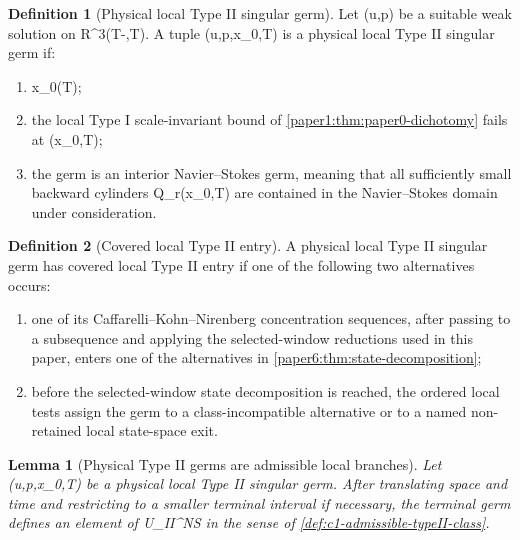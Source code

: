 \documentclass[11pt]{amsart}
\def\({}%
\def\){}%
\def\mathrm#1{#1}%
\def\mathbb#1{#1}%
\theoremstyle{plain}
\newtheorem{lemma}[lemma]{Lemma}
\theoremstyle{definition}
\newtheorem{definition}[definition]{Definition}
\theoremstyle{remark}
\begin{document}
\begin{definition}[Physical local Type II singular germ]
\label{paper6:def:physical-local-typeII-germ}
Let \((u,p)\) be a suitable weak solution on
\(\mathbb R^3\times(T-\delta,T)\).  A tuple
\((u,p,x_0,T)\) is a physical local Type II singular germ if:
\begin{enumerate}[label=\textup{(\roman*)}]
\item \(x_0\in\Sigma(T)\);
\item the local Type I scale-invariant bound of
\cref{paper1:thm:paper0-dichotomy} fails at \((x_0,T)\);
\item the germ is an interior Navier--Stokes germ, meaning that all sufficiently
small backward cylinders \(Q_r(x_0,T)\) are contained in the Navier--Stokes
domain under consideration.
\end{enumerate}
\end{definition}

\begin{definition}[Covered local Type II entry]
\label{paper6:def:covered-local-typeII-entry}
A physical local Type II singular germ has covered local Type II entry if one
of the following two alternatives occurs:
\begin{enumerate}[label=\textup{(\roman*)}]
\item one of its Caffarelli--Kohn--Nirenberg concentration sequences, after
passing to a subsequence and applying the selected-window reductions used in
this paper, enters one of the alternatives in
\cref{paper6:thm:state-decomposition};
\item before the selected-window state decomposition is reached, the ordered
local tests assign the germ to a class-incompatible alternative or to a named
non-retained local state-space exit.
\end{enumerate}
\end{definition}

\begin{lemma}[Physical Type II germs are admissible local branches]
\label{paper6:lem:physical-typeII-germ-admissible}
Let \((u,p,x_0,T)\) be a physical local Type II singular germ.  After translating
space and time and restricting to a smaller terminal interval if necessary, the
terminal germ defines an element of
\(\mathcal U_{\mathrm{II}}^{NS}\) in the sense of
\cref{def:c1-admissible-typeII-class}.
\end{lemma}
\end{document}
